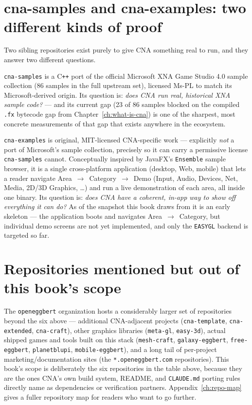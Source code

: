 \section{cna-samples and cna-examples: two different kinds of proof}

Two sibling repositories exist purely to give CNA something real to run, and they answer two
different questions.

\texttt{cna-samples} is a C\texttt{++} port of the official Microsoft XNA Game Studio 4.0
sample collection (86 samples in the full upstream set), licensed Ms-PL to match its
Microsoft-derived origin. Its question is: \emph{does CNA run real, historical XNA sample
code?} --- and its current gap (23 of 86 samples blocked on the compiled \texttt{.fx}
bytecode gap from Chapter~\ref{ch:what-is-cna}) is one of the sharpest, most concrete
measurements of that gap that exists anywhere in the ecosystem.

\texttt{cna-examples} is original, MIT-licensed CNA-specific work --- explicitly \emph{not}
a port of Microsoft's sample collection, precisely so it can carry a permissive license
\texttt{cna-samples} cannot. Conceptually inspired by JavaFX's \texttt{Ensemble} sample
browser, it is a single cross-platform application (desktop, Web, mobile) that lets a reader
navigate Area~$\to$~Category~$\to$~Demo (Input, Audio, Devices, Net, Media, 2D/3D Graphics,
\ldots) and run a live demonstration of each area, all inside one binary. Its question is:
\emph{does CNA have a coherent, in-app way to show off everything it can do?} As of the
snapshot this book draws from it is an early skeleton --- the application boots and
navigates Area~$\to$~Category, but individual demo screens are not yet implemented, and only
the \texttt{EASYGL} backend is targeted so far.

\section{Repositories mentioned but out of this book's scope}

The \texttt{openeggbert} organization hosts a considerably larger set of repositories beyond
the six above --- additional CNA-adjacent projects (\texttt{cna-template}, \texttt{cna-extended},
\texttt{cna-craft}), other graphics libraries (\texttt{meta-gl}, \texttt{easy-3d}), actual
shipped games and tools built on this stack (\texttt{mesh-craft}, \texttt{galaxy-eggbert},
\texttt{free-eggbert}, \texttt{planetblupi}, \texttt{mobile-eggbert}), and a long tail of
per-project marketing/documentation sites (the \texttt{*.openeggbert.com} repositories). This
book's scope is deliberately the six repositories in the table above, because they are the
ones CNA's own build system, README, and \texttt{CLAUDE.md} porting rules directly name as
dependencies or verification partners. Appendix~\ref{ch:repo-map} gives a fuller repository
map for readers who want to go further.
